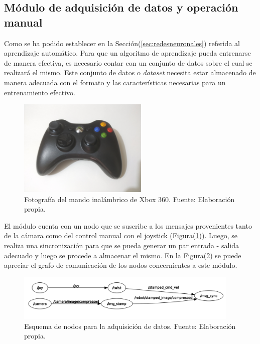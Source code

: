     \subsection{Módulo de adquisición de datos y operación manual}
    Como se ha podido establecer en la Sección(\ref{sec:redesneuronales}) referida al aprendizaje automático. Para que un algoritmo de aprendizaje pueda 
    entrenarse de manera efectiva, es necesario contar con un conjunto de datos sobre el cual se realizará el mismo. Este conjunto 
    de datos o \textit{dataset} necesita estar almacenado de manera adecuada con el formato y las características necesarias para 
    un entrenamiento efectivo.
    
    \begin{figure}[!h] 
        \centering
        \includegraphics[width=0.55\textwidth]{img/joystick}
        \caption[Fotografía del mando inalámbrico de Xbox 360]{Fotografía del mando inalámbrico de Xbox 360. Fuente: Elaboración propia. }
        \label{fig:joystick}
    \end{figure}

    El módulo cuenta con un nodo que se suscribe a los mensajes provenientes tanto de la cámara como del control manual con el 
    joystick (Figura(\ref{fig:joystick})). Luego, se realiza una sincronización para que se pueda generar un par entrada - salida 
    adecuado y luego se procede a almacenar el mismo. En la Figura(\ref{fig:nodosdaq}) se puede apreciar el grafo de comunicación de los 
    nodos concernientes a este módulo.


    
    \begin{figure}[!h] 
        \centering
        \includegraphics[width=0.95\textwidth]{img/nodosdaq}
        \caption[Esquema de nodos para la adquisición de datos]{Esquema de nodos para la adquisición de datos. Fuente: Elaboración propia. }
        \label{fig:nodosdaq}
    \end{figure}

